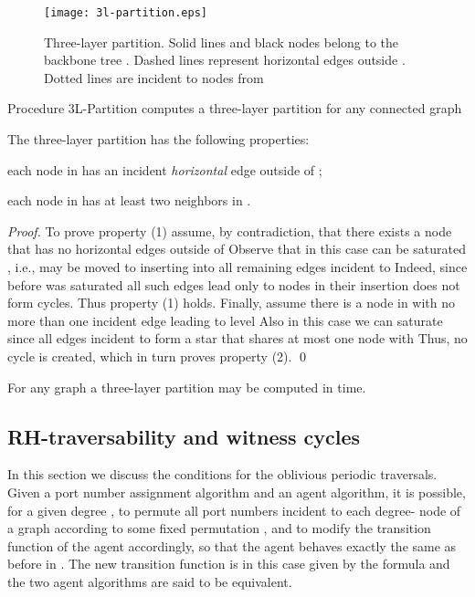 \documentclass[11pt,envcountsame,oribibl]{llncs}
\begin{document}
\vspace*{-0.3cm}
\begin{figure}[htbp] \centering
   \texttt{[image: 3l-partition.eps]}
   \caption{Three-layer partition. Solid lines and black nodes belong
   to the backbone tree .
   Dashed lines represent horizontal edges outside . Dotted lines
   are incident to nodes from }
   \label{fig:3l-partition}
\end{figure}




\begin{lemma}\label{lem:algo}
Procedure {\sc 3L-Partition} computes a three-layer
partition for any connected graph 
\end{lemma}

\begin{lemma}\label{lm:3-conditions}
The three-layer partition has the following properties:
\begin{description}
\vspace{-0.2cm}
\item[(1)] each node in  has an incident {\sl horizontal} edge outside of ;
\vspace{-0.2cm}
\item[(2)] each node in  has at least two neighbors in .
\end{description}
\end{lemma}
\begin{proof}
To prove property (1) assume, by contradiction, that there exists
a node  that has no horizontal edges outside of  Observe that
in this case  can be saturated , i.e.,  may be moved to 
inserting into  all remaining
edges incident to  Indeed, since before  was saturated all such edges lead only
to nodes in  their insertion does not form cycles. Thus property (1) holds.
Finally, assume there is a node  in  with no more than one incident edge leading
to level  Also in this case we can saturate  since all edges incident to 
form a star that shares at most one node with  Thus, no cycle is
created, which in turn proves property (2). \qed
\end{proof}







\begin{lemma}\label{lm:3layer-complexity}
For any graph  a three-layer partition may be computed in  time.
\end{lemma}


\subsection{RH-traversability and witness cycles}
In this section we discuss the conditions for the oblivious periodic
traversals. Given a port number assignment algorithm and an agent
algorithm, it is possible, for a given degree , to permute all port
numbers incident to each degree- node of a graph  according to
some fixed permutation , and to modify the transition function
 of the agent accordingly, so that the agent behaves exactly the
same as before in . The new transition function  is in this
case given by the formula  and
the two agent algorithms are said to be equivalent.
\end{document}
